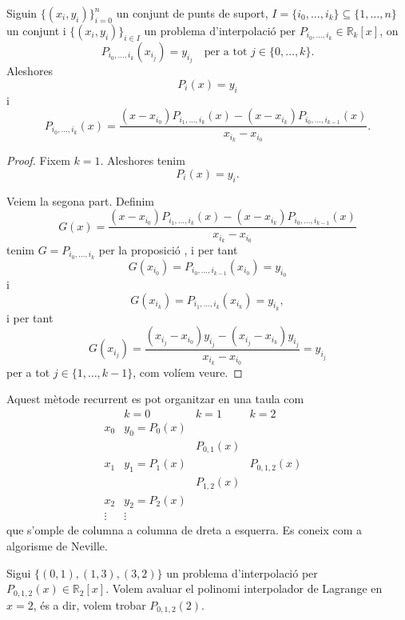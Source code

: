 \documentclass[../Apunts.tex]{subfiles}
\begin{document}
	\begin{proposition}\label{prop:Algorisme de Neville}
		Siguin \(\{(x_{i},y_{i})\}_{i=0}^{n}\) un conjunt de punts de suport, \(I=\{i_{0},\dots,i_{k}\}\subseteq\{1,\dots,n\}\) un conjunt i \(\{(x_{i},y_{i})\}_{i\in I}\) un problema d'interpolació per \(P_{i_{0},\dots,i_{k}}\in\mathbb{R}_{k}[x]\), on
		\[P_{i_{0},\dots,i_{k}}\left(x_{i_{j}}\right)=y_{i_{j}}\quad\text{per a tot }j\in\{0,\dots,k\}.\]
		Aleshores
		\[P_{i}(x)=y_{i}\]
		i
		\[P_{i_{0},\dots,i_{k}}(x)=\frac{\left(x-x_{i_{0}}\right)P_{i_{1},\dots,i_{k}}(x)-\left(x-x_{i_{k}}\right)P_{i_{0},\dots,i_{k-1}}(x)}{x_{i_{k}}-x_{i_{0}}}.\]
	\end{proposition}
	\begin{proof}
		Fixem \(k=1\). Aleshores tenim
		\[P_{i}(x)=y_{i}.\]
		
		Veiem la segona part. Definim 
		\[G(x)=\frac{\left(x-x_{i_{0}}\right)P_{i_{1},\dots,i_{k}}(x)-\left(x-x_{i_{k}}\right)P_{i_{0},\dots,i_{k-1}}(x)}{x_{i_{k}}-x_{i_{0}}}\]
		tenim \(G=P_{i_{0},\dots,i_{k}}\) per la proposició , i per tant
		\[G(x_{i_{0}})=P_{i_{0},\dots,i_{k-1}}(x_{i_0})=y_{i_{0}}\]
		i
		\[G(x_{i_{k}})=P_{i_{1},\dots,i_{k}}(x_{i_k})=y_{i_{k}},\]
		i per tant
		\[G(x_{i_{j}})=\frac{(x_{i_{j}}-x_{i_{0}})y_{i_{j}}-(x_{i_{j}}-x_{i_{k}})y_{i_{j}}}{x_{i_{k}}-x_{i_{0}}}=y_{i_{j}}\]
		per a tot \(j\in\{1,\dots,k-1\}\), com volíem veure.
	\end{proof}
	\begin{observation}\label{obs:Algorisme de Neville}
		Aquest mètode recurrent es pot organitzar en una taula com
		\[\begin{array}{c|cccc}
		& k=0 & k=1 & k=2 & \\\hline
		x_{0} & y_{0}=P_{0}(x) & & & \\
		& & P_{0,1}(x) & &\\
		x_{1} & y_{1}=P_{1}(x) & & P_{0,1,2}(x) &\\
		& & P_{1,2}(x) & & \\
		x_{2} & y_{2}=P_{2}(x) & & &\\
		\vdots & \vdots & & &
		\end{array}\]
		que s'omple de columna a columna de dreta a esquerra. Es coneix com a algorisme de Neville.
	\end{observation}
	\begin{example}\label{ex:Algorisme de Neville}
		Sigui \(\{(0,1),(1,3),(3,2)\}\) un problema d'interpolació per \(P_{0,1,2}(x)\in\mathbb{R}_{2}[x]\). Volem avaluar el polinomi interpolador de Lagrange en \(x=2\), és a dir, volem trobar \(P_{0,1,2}(2)\).
	\end{example}
\end{document}
